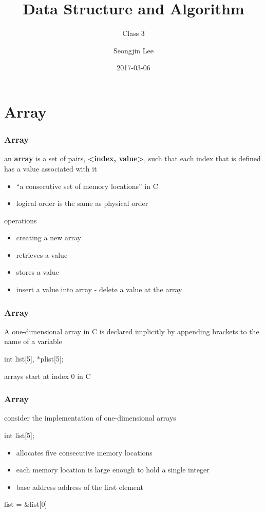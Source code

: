 \documentclass[newPxFont,sthlmFooter,nooffset]{beamer}
\title{Data Structure and Algorithm}
\subtitle{Class 3}
\author[SJL]{Seongjin Lee}
\institute{\href{mailto:insight@gnu.ac.kr}{insight@gnu.ac.kr}\\\url{http://resourceful.github.io}\\Systems Research Lab.\\GNU}
\date{2017-03-06}
\begin{document}
\frame[plain,t]{\titlepage} 



\section{Array} 
\begin{frame}[t]
  \frametitle{Array}
an \textbf{array} is a set of pairs, \textbf{<index, value>}, such that each index that is defined has a value associated with it
\begin{itemize}
\item  ``a consecutive set of memory locations'' in C
\item  logical order is the same as physical order
\end{itemize}

operations
\begin{itemize}
\item creating a new array
\item retrieves a value
\item stores a value
\item insert a value into array - delete a value at the array
\end{itemize}

\end{frame}

\begin{frame}[t, fragile]
  \frametitle{Array}
A one-dimensional array in C is declared implicitly by appending brackets to the name of a variable

\begin{codedef}
  int list[5], *plist[5];
\end{codedef}

arrays start at index 0 in C  
\end{frame}

\begin{frame}[t, fragile]
  \frametitle{Array}
consider the implementation of one-dimensional arrays

\begin{codedefnb}
int list[5];
\end{codedefnb}

\begin{itemize}
\item allocates five consecutive memory locations
\item each memory location is large enough to hold a single integer
\item base address address of the first element
\end{itemize}

\begin{codedefnb}
list = &list[0]
\end{codedefnb}

\end{frame}
\end{document}
